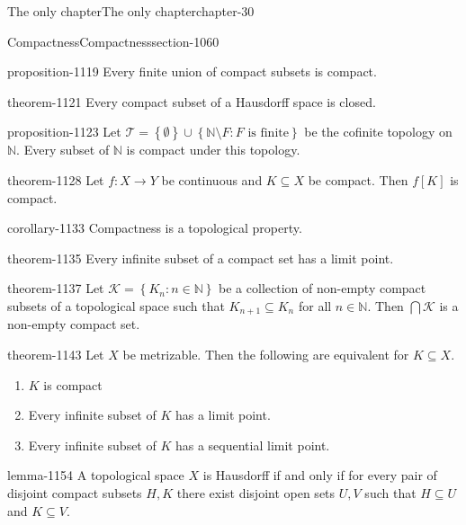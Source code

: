 \documentclass[oneside,10pt,]{book}
\newcommand{\mb}{\mathbb}
\newcommand{\mc}{\mathcal}
\newcommand{\setBuilder}[2]{\left\{#1:#2\right\}}
\newcommand{\setList}[1]{\left\{#1\right\}}
\begin{document}
\begin{chapterptx}{The only chapter}{}{The only chapter}{}{}{chapter-30}
\begin{sectionptx}{Compactness}{}{Compactness}{}{}{section-1060}
\begin{proposition}{}{}{proposition-1119}%
\hypertarget{p-1120}{}%
Every finite union of compact subsets is compact.%
\end{proposition}
\begin{theorem}{}{}{theorem-1121}%
\hypertarget{p-1122}{}%
Every compact subset of a Hausdorff space is closed.%
\end{theorem}
\begin{proposition}{}{}{proposition-1123}%
\hypertarget{p-1124}{}%
Let \(\mc T=\setList{\emptyset}\cup
\setBuilder{\mb N\setminus F}{F\text{ is finite}}\) be the cofinite topology on \(\mb N\). Every subset of \(\mb N\) is compact under this topology.%
\end{proposition}
\begin{theorem}{}{}{theorem-1128}%
\hypertarget{p-1129}{}%
Let \(f:X\to Y\) be continuous and \(K\subseteq X\) be compact. Then \(f[K]\) is compact.%
\end{theorem}
\begin{corollary}{}{}{corollary-1133}%
\hypertarget{p-1134}{}%
Compactness is a topological property.%
\end{corollary}
\begin{theorem}{}{}{theorem-1135}%
\hypertarget{p-1136}{}%
Every infinite subset of a compact set has a limit point.%
\end{theorem}
\begin{theorem}{}{}{theorem-1137}%
\hypertarget{p-1138}{}%
Let \(\mc K=\setBuilder{K_n}{n\in\mb N}\) be a collection of non-empty compact subsets of a topological space such that \(K_{n+1}\subseteq K_n\) for all \(n\in\mb N\). Then \(\bigcap\mc K\) is a non-empty compact set.%
\end{theorem}
\begin{theorem}{}{}{theorem-1143}%
\hypertarget{p-1144}{}%
Let \(X\) be metrizable. Then the following are equivalent for \(K\subseteq X\).%
\leavevmode%
\begin{enumerate}
\item\hypertarget{li-1148}{}\(K\) is compact%
\item\hypertarget{li-1150}{}Every infinite subset of \(K\) has a limit point.%
\item\hypertarget{li-1152}{}Every infinite subset of \(K\) has a sequential limit point.%
\end{enumerate}
\end{theorem}
\begin{lemma}{}{}{lemma-1154}%
\hypertarget{p-1155}{}%
A topological space \(X\) is Hausdorff if and only if for every pair of disjoint compact subsets \(H,K\) there exist disjoint open sets \(U,V\) such that \(H\subseteq U\) and \(K\subseteq V\).%

\end{lemma}
\end{sectionptx}
\end{chapterptx}
\end{document}
